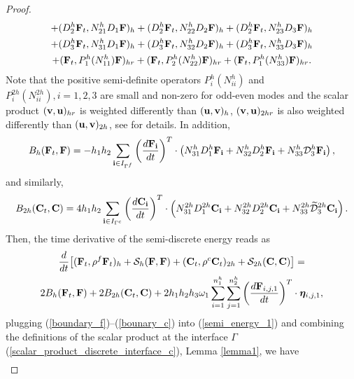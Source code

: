 \begin{proof}
\begin{multline*}
+  ({D}_2^{h}{\bf F}_t,{N}_{21}^{h}{D}_1{\bf F})_{h} 
+  ({D}_2^{h}{\bf F}_t,{N}_{22}^{h}{D}_2{\bf F})_{h} +  ({D}_2^{h}{\bf F}_t,{N}_{23}^{h}{D}_3{\bf F})_{h} \\
+  ({D}_3^{h}{\bf F}_t,{N}_{31}^{h}{D}_1{\bf F})_{h} 
+  ({D}_3^{h}{\bf F}_t,{N}_{32}^{h}{D}_2{\bf F})_{h} +  ({D}_3^{h}{\bf F}_t,{N}_{33}^{h}{D}_3{\bf F})_{h}\\
+ ({\bf F}_t, P^{h}_1(N_{11}^h){\bf F})_{hr} + ({\bf F}_t, P^{h}_2(N_{22}^h){\bf F})_{hr} + ({\bf F}_t, P^{h}_1(N_{33}^h){\bf F})_{hr}.
\end{multline*}
Note that the positive semi-definite operators $P_i^{h}(N_{ii}^{h})$ and $P_i^{2h}(N_{ii}^{2h}), i = 1,2,3$ are small and non-zero for odd-even modes and the scalar product $({\bf v}, {\bf u})_{hr}$ is weighted differently than $({\bf u}, {\bf v})_h$, $({\bf v}, {\bf u})_{2hr}$ is also weighted differently than $({\bf u}, {\bf v})_{2h}$, see \cite{sjogreen2012fourth, petersson2015wave} for details. In addition,
\begin{equation}\label{boundary_f}
B_h ({\bf F}_t,{\bf F}) = -h_1h_2\sum_{{\bf i}\in I_{\Gamma^f}}\left(\frac{d{\bf F}_{\bf i}}{dt}\right)^T\cdot\left({N}_{31}^h{D}_1^h {\bf F}_{\bf i}+ {N}_{32}^h{D}_2^h{\bf F}_{\bf i}+{N}_{33}^h\mathcal{D}_3^h{\bf F}_{\bf i}\right),
\end{equation}
and similarly, 
\begin{equation}\label{bounary_c}
B_{2h} ({\bf C}_t,{\bf C}) = 4h_1h_2\sum_{{\bf i}\in I_{\Gamma^c}}\left(\frac{d{\bf C}_{\bf i}}{dt}\right)^T\cdot\left({N}_{31}^{2h}{D}_1^{2h}{\bf C}_{\bf i}+{N}_{32}^{2h}{D}_2^{2h}{\bf C}_{\bf i}+{N}_{33}^{2h}\wt{\mathcal{D}}_3^{2h}{\bf C}_{\bf i}\right).
\end{equation}
Then, the time derivative of the semi-discrete energy reads as
\begin{multline}\label{semi_energy_1}
\frac{d}{dt}\big[({\bf F}_t,\rho^f {\bf F}_t)_h + \mathcal{S}_{h}({\bf F},{\bf F}) + ({\bf C}_t,\rho^{c} {\bf C}_t)_{2h} + \mathcal{S}_{2h}({\bf C},{\bf C}) \big]  = \\
2B_{h}({\bf F}_t,{\bf F}) + 2B_{2h}({\bf C}_t,{\bf C}) + 2h_1h_2h_3\omega_1\sum_{i = 1}^{n_1^h}\sum_{j=1}^{n_2^h}\left(\frac{d{\bf F}_{i,j,1}}{dt}\right)^T\cdot{\bm \eta}_{i,j,1},
\end{multline}
plugging (\ref{boundary_f})--(\ref{bounary_c}) into (\ref{semi_energy_1}) and combining the definitions of the scalar product at the interface $\Gamma$ (\ref{scalar_product_discrete_interface_c}), Lemma \ref{lemma1}, we have
\begin{align*}\label{semi_energy_2}

\end{align*}
\end{proof}

